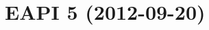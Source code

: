 \documentclass[a4paper,nofoldmark]{leaflet}
\newcommand{\code}[1]{\texttt{#1}}
\newcommand{\featureref}[1]{\textsc{#1} on page~\pageref{feat:#1}}
\begin{document}

\section{EAPI 5 (2012-09-20)}
\label{sec:cs:eapi5}
\end{document}

